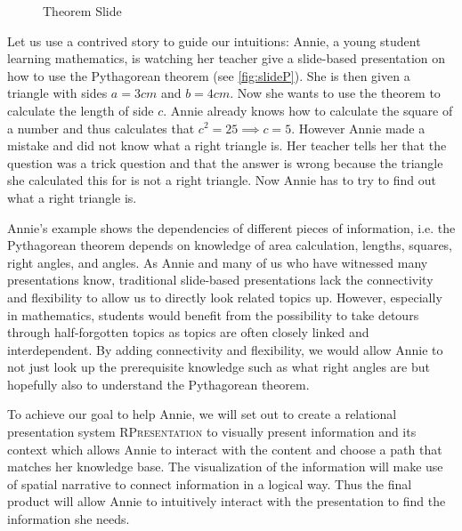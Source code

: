 \documentclass{llncs}
\newcommand{\sys}{\textsc{RPresentation}\xspace}
\begin{document}
\begin{figure}\centering\vspace{-2em}
  \vspace{-.5em}
  \caption{Theorem Slide}\label{fig:slideP}
  \vspace{-20pt}
\end{figure}

Let us use a contrived story to guide our intuitions: Annie, a young student learning
mathematics, is watching her teacher give a slide-based presentation on how to use the
Pythagorean theorem (see \autoref{fig:slideP}). She is then given a triangle with sides
$a = 3 cm$ and $b = 4 cm$. Now she wants to use the theorem to calculate the length of
side $c$. Annie already knows how to calculate the square of a number and thus calculates
that $c^2 = 25 \implies c = 5$. However Annie made a mistake and did not know what a right
triangle is. Her teacher tells her that the question was a trick question and that the
answer is wrong because the triangle she calculated this for is not a right triangle. Now
Annie has to try to find out what a right triangle is.

Annie's example shows the dependencies of different pieces of information, i.e. the Pythagorean theorem depends on knowledge of area calculation, lengths, squares, right angles, and angles. As Annie and many of us who have witnessed many presentations know, traditional slide-based presentations lack the connectivity and flexibility to allow us to directly look related topics up. However, especially in mathematics, students would benefit from the possibility to take detours through half-forgotten topics as topics are often closely linked and interdependent. By adding connectivity and flexibility, we would allow Annie to not just look up the prerequisite knowledge such as what right angles are but hopefully also to understand the Pythagorean theorem.

To achieve our goal to help Annie, we will set out to create a relational presentation system \sys to visually present information and its context which allows Annie to interact with the content and choose a path that matches her knowledge base. The visualization of the information will make use of spatial narrative to connect information in a logical way. Thus the final product will allow Annie to intuitively interact with the presentation to find the information she needs.
\end{document}
